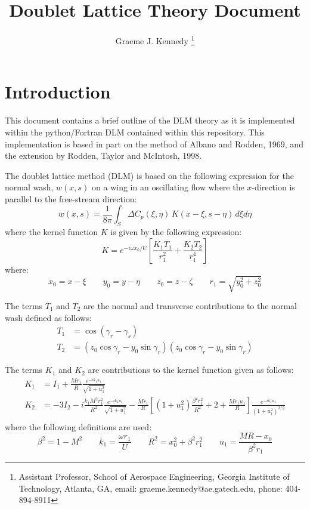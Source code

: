 \documentclass[12pt]{article}
\title{Doublet Lattice Theory Document}
\author{Graeme J. Kennedy
  \thanks{Assistant Professor, School of Aerospace Engineering,
    Georgia Institute of Technology, Atlanta, GA, email:
    graeme.kennedy@ae.gatech.edu, phone: 404-894-8911}}
\date{}
\newcommand{\f}{\frac}
\begin{document}
\maketitle

\section{Introduction}

This document contains a brief outline of the DLM theory as it is
implemented within the python/Fortran DLM contained within this
repository. This implementation is based in part on the method of
Albano and Rodden, 1969, and the extension by Rodden, Taylor and
McIntosh, 1998.

The doublet lattice method (DLM) is based on the following expression
for the normal wash, $w(x, s)$ on a wing in an oscillating flow where
the $x$-direction is parallel to the free-stream direction:
%
\begin{equation}
  \label{eqn:normal-wash}
  w(x, s) = \f{1}{8\pi} 
  \int_{S} \Delta C_p(\xi, \eta) \, K(x - \xi, s - \eta) \, d\xi d\eta 
\end{equation}
where the kernel function $K$ is given by the following expression:
%
\begin{equation*}
  K = e^{-i\omega x_{0}/U} \left[ \f{K_1 T_1}{r_{1}^2} + \f{K_2 T_2}{r_{1}^4} \right]
\end{equation*}
where:
%
\begin{equation*}
  x_{0} = x - \xi \qquad
  y_{0} = y - \eta \qquad
  z_{0} = z - \zeta \qquad 
  r_{1} = \sqrt{y_{0}^2 + z_{0}^2}
\end{equation*}

The terms $T_{1}$ and $T_{2}$ are the normal and transverse
contributions to the normal wash defined as follows:
\begin{equation*}
  \begin{aligned}
    T_{1} & = \cos(\gamma_r - \gamma_s) \\
    T_{2} & = (z_{0} \cos \gamma_r - y_{0} \sin \gamma_r)(z_{0} \cos \gamma_r - y_{0} \sin \gamma_r)
  \end{aligned}
\end{equation*}

The terms $K_{1}$ and $K_{2}$ are contributions to the kernel function
given as follows:
%
\begin{equation*}
  \begin{aligned}
    K_{1} & = I_{1} + \f{Mr_{1}}{R} \f{e^{-ik_1 u_1}}{\sqrt{1 + u_{1}^2}} \\
    K_{2} & = -3I_{2} - i \f{k_1 M^2r_1^2}{R^2} \f{e^{-ik_1 u_1}}{\sqrt{1 + u_{1}^2}} 
    - \f{Mr_{1}}{R} \left[ (1 + u_{1}^2) \f{\beta^2r_{1}^2}{R^2} + 
      2 + \f{Mr_1u_{1}}{R} \right]\f{e^{-ik_1 u_1}}{(1 + u_{1}^2)^{3/2}} \\
  \end{aligned}
\end{equation*}
where the following definitions are used:
\begin{equation*}
  \beta^2 = 1 - M^2 \qquad 
  k_{1} = \f{\omega r_{1}}{U} \qquad 
  R^2 = x_{0}^2 + \beta^2r_{1}^2 \qquad 
  u_{1} = \f{MR - x_{0}}{\beta^2r_1}
\end{equation*}
\end{document}
